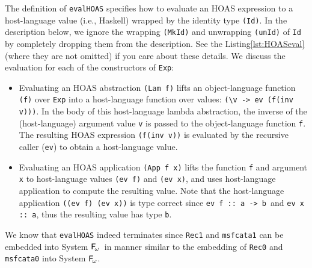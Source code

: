 \documentclass[a4paper,UKenglish]{lipics}
\newcommand{\ie}[0]{{i.e.}}
\newcommand{\Fw}[0]{{\ensuremath{\mathsf{\uppercase{F}}_{\!\omega}}}}
\begin{document}
\begin{figure}

\vspace*{-3ex}
\end{figure}

The definition of \lstinline{evalHOAS} specifies how to evaluate
an HOAS expression to a host-language value (\ie, Haskell) wrapped by
the identity type \lstinline{(Id)}. In the description below, we ignore
the wrapping \lstinline{(MkId)} and unwrapping \lstinline{(unId)} of
\lstinline{Id} by completely dropping them from the description.
See the Listing\;\ref{lst:HOASeval} (where they are not omitted)
if you care about these details. We discuss the evaluation for each of
the constructors of \lstinline{Exp}:
\begin{itemize}
	\item Evaluating an HOAS abstraction \lstinline{(Lam f)} lifts
		an object-language function \lstinline{(f)} over \lstinline{Exp}
		into a host-language function over values:
		\lstinline{(\v -> ev (f(inv v)))}.
		In the body of this host-language lambda abstraction,
		the inverse of the (host-language) argument value \lstinline{v}
		is passed to the object-language function \lstinline{f}.
		The resulting HOAS expression \lstinline{(f(inv v))} is
		evaluated by the recursive caller (\lstinline{ev}) to
		obtain a host-language value.

	\item Evaluating an HOAS application \lstinline{(App f x)} lifts
		the function \lstinline{f} and argument \lstinline{x} to
		host-language values \lstinline{(ev f)} and \lstinline{(ev x)},
		and uses host-language application to compute
		the resulting value. Note that the host-language application
		\lstinline{((ev f) (ev x))} is type correct since
		\lstinline{ev f :: a -> b}\, and \lstinline{ev x :: a},
		thus the resulting value has type \lstinline{b}.
\end{itemize}
We know that \lstinline{evalHOAS} indeed terminates since \lstinline{Rec1} and
\lstinline{msfcata1} can be embedded into System \Fw\ in manner similar to
the embedding of \lstinline{Rec0} and \lstinline{msfcata0} into System \Fw.
\end{document}
